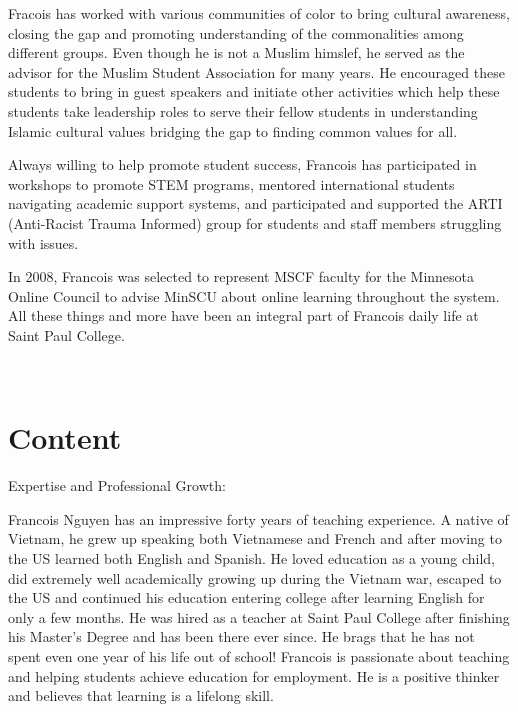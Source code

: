 \documentclass[
]{book}
\begin{document}
Fracois has worked with various communities of color to bring cultural awareness, closing the gap and promoting understanding of the commonalities among different groups. Even though he is not a Muslim himslef, he served as the advisor for the Muslim Student Association for many years. He encouraged these students to bring in guest speakers and initiate other activities which help these students take leadership roles to serve their fellow students in understanding Islamic cultural values bridging the gap to finding common values for all.

Always willing to help promote student success, Francois has participated in workshops to promote STEM programs, mentored international students navigating academic support systems, and participated and supported the ARTI (Anti-Racist Trauma Informed) group for students and staff members struggling with issues.

In 2008, Francois was selected to represent MSCF faculty for the Minnesota Online Council to advise MinSCU about online learning throughout the system. All these things and more have been an integral part of Francois daily life at Saint Paul College.

 

\chapter{Content}\label{content}

Expertise and Professional Growth:

Francois Nguyen has an impressive forty years of teaching experience. A native of Vietnam, he grew up speaking both Vietnamese and French and after moving to the US learned both English and Spanish. He loved education as a young child, did extremely well academically growing up during the Vietnam war, escaped to the US and continued his education entering college after learning English for only a few months. He was hired as a teacher at Saint Paul College after finishing his Master's Degree and has been there ever since. He brags that he has not spent even one year of his life out of school! Francois is passionate about teaching and helping students achieve education for employment. He is a positive thinker and believes that learning is a lifelong skill.
\end{document}
